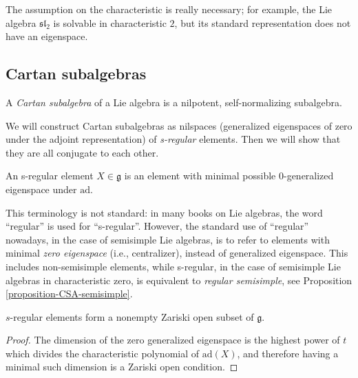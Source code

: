 \begin{remark}
 \label{remark-Lie-positive-characteristic}
The assumption on the characteristic is really necessary; for example, the Lie algebra $\mathfrak{sl}_2$ is solvable in characteristic $2$, but its standard representation does not have an eigenspace.
\end{remark}

\subsection{Cartan subalgebras}
\label{subsection-CSA}

\begin{definition}
 \label{definition-CSA}
A {\it Cartan subalgebra} of a Lie algebra is a nilpotent, self-normalizing subalgebra. 
\end{definition}


We will construct Cartan subalgebras as nilspaces (generalized eigenspaces of zero under the adjoint representation) of \emph{s-regular} elements. Then we will show that they are all conjugate to each other.

\begin{definition}
\label{definition-s-regular}
 An s-regular element $X\in\mathfrak g$ is an element with minimal possible $0$-generalized eigenspace under $\text{ad}$.
\end{definition}

This terminology is not standard: in many books on Lie algebras, the word ``regular'' is used for ``s-regular''. However, the standard use of ``regular'' nowadays, in the case of semisimple Lie algebras, is to refer to elements with minimal \emph{zero eigenspace} (i.e., centralizer), instead of generalized eigenspace. This includes non-semisimple elements, while s-regular, in the case of semisimple Lie algebras in characteristic zero, is equivalent to \emph{regular semisimple}, see Proposition \ref{proposition-CSA-semisimple}.



\begin{lemma}
\label{lemma-sregular-exist}
$s$-regular elements form a nonempty Zariski open subset of $\mathfrak g$. 
\end{lemma}

\begin{proof}
The dimension of the zero generalized eigenspace is the highest power of $t$ which divides the characteristic polynomial of $\text{ad}(X)$, and therefore having a minimal such dimension is a Zariski open condition.
\end{proof}


